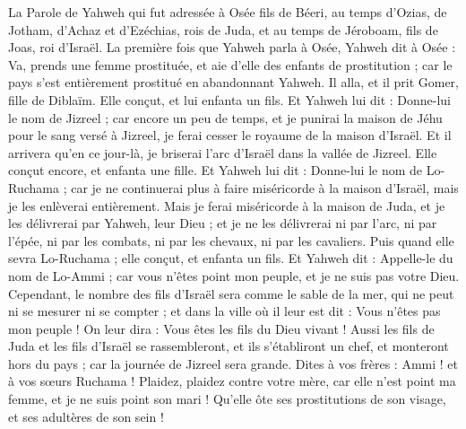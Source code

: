 \begin{multicols}{2}
\VerseOne{}La Parole de Yahweh qui fut adressée à Osée fils de Béeri, au temps d’Ozias, de Jotham, d’Achaz et d’Ezéchias, rois de Juda, et au temps de Jéroboam, fils de Joas, roi d'Israël.
La première fois que Yahweh parla à Osée, Yahweh dit à Osée : Va, prends une femme prostituée, et aie d'elle des enfants de prostitution ; car le pays s’est entièrement prostitué en abandonnant Yahweh.
Il alla, et il prit Gomer, fille de Diblaïm. Elle conçut, et lui enfanta un fils.
Et Yahweh lui dit : Donne-lui le nom de Jizreel ; car encore un peu de temps, et je punirai la maison de Jéhu pour le sang versé à Jizreel, je ferai cesser le royaume de la maison d'Israël.
Et il arrivera qu'en ce jour-là, je briserai l'arc d'Israël dans la vallée de Jizreel.
Elle conçut encore, et enfanta une fille. Et Yahweh lui dit : Donne-lui le nom de Lo-Ruchama  ; car je ne continuerai plus à faire miséricorde à la maison d'Israël, mais je les enlèverai entièrement.
Mais je ferai miséricorde à la maison de Juda, et je les délivrerai par Yahweh, leur Dieu ; et je ne les délivrerai ni par l'arc, ni par l'épée, ni par les combats, ni par les chevaux, ni par les cavaliers.
Puis quand elle sevra Lo-Ruchama ; elle conçut, et enfanta un fils.
Et Yahweh dit : Appelle-le du nom de Lo-Ammi ; car vous n'êtes point mon peuple, et je ne suis pas votre Dieu.
\VerseOne{}Cependant, le nombre des fils d'Israël sera comme le sable de la mer, qui ne peut ni se mesurer ni se compter ; et dans la ville où il leur est dit : Vous n’êtes pas mon peuple ! On leur dira : Vous êtes les fils du Dieu vivant !
Aussi les fils de Juda et les fils d'Israël se rassembleront, et ils s'établiront un chef, et monteront hors du pays ; car la journée de Jizreel sera grande.
Dites à vos frères : Ammi ! et à vos sœurs Ruchama !
Plaidez, plaidez contre votre mère, car elle n’est point ma femme, et je ne suis point son mari ! Qu’elle ôte ses  prostitutions de son visage, et ses adultères de son sein !

\end{multicols}
